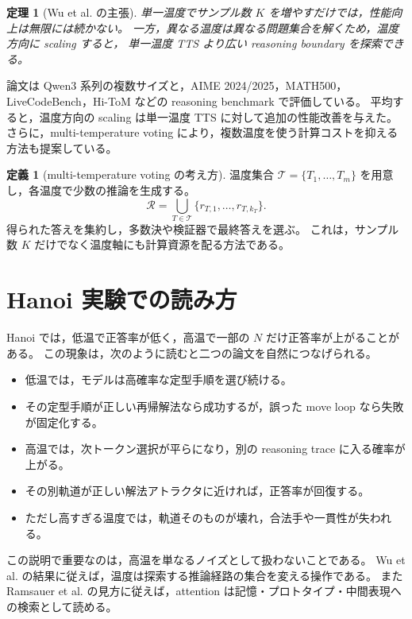\documentclass[a4paper,11pt]{ltjsarticle}
\theoremstyle{definition}
\newtheorem{definition}{定義}[section]
\theoremstyle{plain}
\newtheorem{theorem}{定理}[section]
\theoremstyle{remark}
\begin{document}
\begin{theorem}[Wu et al. の主張]
単一温度でサンプル数 \(K\) を増やすだけでは，性能向上は無限には続かない。
一方，異なる温度は異なる問題集合を解くため，温度方向に scaling すると，
単一温度 TTS より広い reasoning boundary を探索できる。
\end{theorem}

論文は Qwen3 系列の複数サイズと，AIME 2024/2025，MATH500，
LiveCodeBench，Hi-ToM などの reasoning benchmark で評価している。
平均すると，温度方向の scaling は単一温度 TTS に対して追加の性能改善を与えた。
さらに，multi-temperature voting により，複数温度を使う計算コストを抑える方法も提案している。

\begin{definition}[multi-temperature voting の考え方]
温度集合 \(\mathcal{T}=\{T_1,\ldots,T_m\}\) を用意し，各温度で少数の推論を生成する。
\[
  \mathcal{R}
  =
  \bigcup_{T\in\mathcal{T}}
  \{r_{T,1},\ldots,r_{T,k_T}\}.
\]
得られた答えを集約し，多数決や検証器で最終答えを選ぶ。
これは，サンプル数 \(K\) だけでなく温度軸にも計算資源を配る方法である。
\end{definition}

\section{Hanoi 実験での読み方}

Hanoi では，低温で正答率が低く，高温で一部の \(N\) だけ正答率が上がることがある。
この現象は，次のように読むと二つの論文を自然につなげられる。

\begin{itemize}
\item 低温では，モデルは高確率な定型手順を選び続ける。
\item その定型手順が正しい再帰解法なら成功するが，誤った move loop なら失敗が固定化する。
\item 高温では，次トークン選択が平らになり，別の reasoning trace に入る確率が上がる。
\item その別軌道が正しい解法アトラクタに近ければ，正答率が回復する。
\item ただし高すぎる温度では，軌道そのものが壊れ，合法手や一貫性が失われる。
\end{itemize}

この説明で重要なのは，高温を単なるノイズとして扱わないことである。
Wu et al. の結果に従えば，温度は探索する推論経路の集合を変える操作である。
また Ramsauer et al. の見方に従えば，attention は記憶・プロトタイプ・中間表現への検索として読める。
\end{document}
